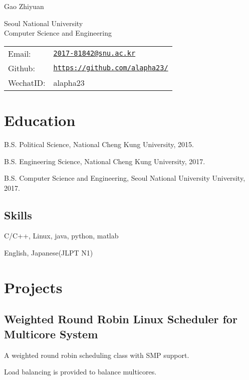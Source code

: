 \documentclass[letterpaper]{article}
\def\name{Gao Zhiyuan}
\renewenvironment{itemize}{
  \begin{list}{}{
    \setlength{\leftmargin}{1.5em}
  }
}{
  \end{list}
}
\begin{document}
{\huge \name}


\vspace{0.25in}
\begin{minipage}{0.45\linewidth}
  Seoul National University \\
  Computer Science and Engineering \\
\end{minipage}
\begin{minipage}{0.45\linewidth}
  \begin{tabular}{ll}
    Email: & \href{mailto:2017-81842@snu.ac.kr}{\tt 2017-81842@snu.ac.kr} \\
    Github: & \href{https://github.com/alapha23/}{\tt https://github.com/alapha23/} \\
	  WechatID: & {alapha23}	\\
  \end{tabular}
\end{minipage}
\section*{Education}
\begin{itemize}
  \item B.S. Political Science, National Cheng Kung University, 2015.
  \item B.S. Engineering Science, National Cheng Kung University, 2017.
  \item B.S. Computer Science and Engineering, Seoul National University University, 2017.
\end{itemize}

\subsection*{\textbf{Skills}}
\begin{itemize}
	\item C/C++, Linux, java, python, matlab
	\item English, Japanese(JLPT N1)
\end{itemize}
\section*{Projects}
\subsection*{\textbf{Weighted Round Robin Linux Scheduler for Multicore System}}
\begin{itemize}
	\item A weighted round robin scheduling class with SMP support.
	\item Load balancing is provided to balance multicores.
\end{itemize}
\end{document}

